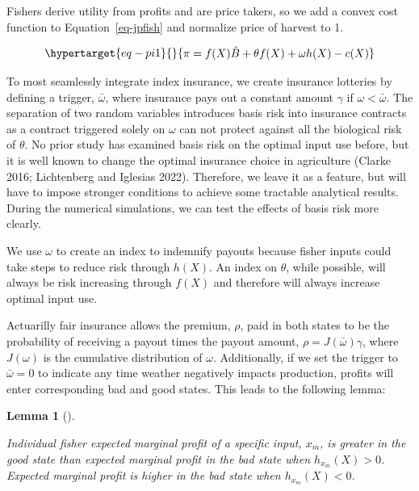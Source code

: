 \documentclass[
  letterpaper,
  DIV=11,
  numbers=noendperiod]{scrartcl}
\theoremstyle{plain}
\theoremstyle{plain}
\newtheorem{lemma}{Lemma}[section]
\theoremstyle{remark}
\begin{document}
Fishers derive utility from profits and are price takers, so we add a
convex cost function to Equation~\ref{eq-jpfish} and normalize price of
harvest to 1.

\begin{equation}\protect\hypertarget{eq-pi1}{}{
\begin{aligned}
\pi=f(X)\hat{B}+\theta f(X)+\omega h(X)-c(X)
\end{aligned}
}\label{eq-pi1}\end{equation}

To most seamlessly integrate index insurance, we create insurance
lotteries by defining a trigger, \(\bar\omega\), where insurance pays
out a constant amount \(\gamma\) if \(\omega<\bar\omega\). The
separation of two random variables introduces basis risk into insurance
contracts as a contract triggered solely on \(\omega\) can not protect
against all the biological risk of \(\theta\). No prior study has
examined basis risk on the optimal input use before, but it is well
known to change the optimal insurance choice in agriculture (Clarke
2016; Lichtenberg and Iglesias 2022). Therefore, we leave it as a
feature, but will have to impose stronger conditions to achieve some
tractable analytical results. During the numerical simulations, we can
test the effects of basis risk more clearly.

We use \(\omega\) to create an index to indemnify payouts because fisher
inputs could take steps to reduce risk through \(h(X)\). An index on
\(\theta\), while possible, will always be risk increasing through
\(f(X)\) and therefore will always increase optimal input use.

Actuarilly fair insurance allows the premium, \(\rho\), paid in both
states to be the probability of receiving a payout times the payout
amount, \(\rho=J(\bar\omega)\gamma\), where \(J(\omega)\) is the
cumulative distribution of \(\omega\). Additionally, if we set the
trigger to \(\bar\omega=0\) to indicate any time weather negatively
impacts production, profits will enter corresponding bad and good
states. This leads to the following lemma:

\begin{lemma}[]\protect\hypertarget{lem-mp}{}\label{lem-mp}

Individual fisher expected marginal profit of a specific input, \(x_m\),
is greater in the good state than expected marginal profit in the bad
state when \(h_{x_m}(X)>0\). Expected marginal profit is higher in the
bad state when \(h_{x_m}(X)<0\).

\end{lemma}
\end{document}
